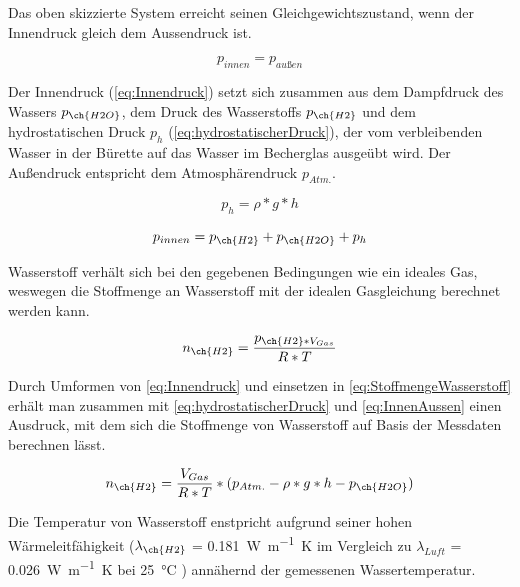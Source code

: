 \documentclass{article}
\begin{document}
      Das oben skizzierte System erreicht seinen Gleichgewichtszustand, wenn der Innendruck gleich dem Aussendruck ist.
    
      \begin{equation}
        p_{innen} = p_{außen} \label{eq:InnenAussen}
      \end{equation}
    
      Der Innendruck (\ref{eq:Innendruck}) setzt sich zusammen aus dem Dampfdruck des Wassers $p_{\ch{H2O}}$, dem Druck des Wasserstoffs $p_{\ch{H2}}$ und dem hydrostatischen Druck $p_{h}$ (\ref{eq:hydrostatischerDruck}), der vom  verbleibenden Wasser in der Bürette auf das Wasser im Becherglas ausgeübt wird. Der Außendruck entspricht dem Atmosphärendruck $ p_{Atm.}$.
    
      \begin{equation} 
        p_{h} = \rho * g * h \label{eq:hydrostatischerDruck}
      \end{equation} 
    
      \begin{equation}
        p_{innen} = p_{\ch{H2}} + p_{\ch{H2O}} + p_{h} \label{eq:Innendruck}
      \end{equation}
    
      Wasserstoff verhält sich bei den gegebenen Bedingungen wie ein ideales Gas, weswegen die Stoffmenge an Wasserstoff mit der idealen Gasgleichung berechnet werden kann.
    
      \begin{equation}
        n_{\ch{H2}} = \frac{p_{\ch{H2} * V_{Gas}}}{R*T} \label{eq:StoffmengeWasserstoff}
      \end{equation}     
    
      Durch Umformen von \eqref{eq:Innendruck} und einsetzen in \eqref{eq:StoffmengeWasserstoff} erhält man zusammen mit \eqref{eq:hydrostatischerDruck} und \eqref{eq:InnenAussen} einen Ausdruck, mit dem sich die Stoffmenge von Wasserstoff auf Basis der Messdaten berechnen lässt.
    
    
      \begin{equation}
        n_{\ch{H2}} = \frac{V_{Gas}}{R*T} * (p_{Atm.} - \rho * g * h - p_{\ch{H2O}}) \label{eq:Stoffmenge}
      \end{equation}
      
      Die Temperatur von Wasserstoff enstpricht aufgrund seiner hohen Wärmeleitfähigkeit ($\lambda_{\ch{H2}}$ = \SI[mode=text]{0.181}{\watt\per\meter\kelvin} im Vergleich zu $\lambda_{Luft}$ = \SI[mode=text]{0.026}{\watt\per\meter\kelvin} bei \SI[mode=text]{25}{\degreeCelsius} \cite{LambdaHydrogen}) annähernd der gemessenen Wassertemperatur.
    
\end{document}
